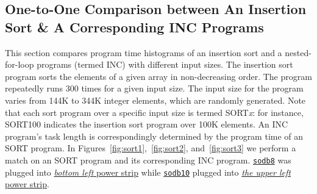 \documentclass[10pt]{article}
\begin{document}
\clearpage
\pagebreak

\subsection{One-to-One Comparison between An Insertion Sort \& A Corresponding INC Programs~\label{sec:sort}} 
This section compares program time histograms 
of an insertion sort and a nested-for-loop programs (termed INC) with different input sizes. The insertion sort program sorts the elements of a given array in non-decreasing order.  The program repeatedly runs 300 times for a given input size. The input size for the program varies from 144K to 344K integer elements, which are randomly generated. Note that each sort program over a specific input size is termed SORT{\it x}: for instance, SORT100 indicates the insertion sort program over 100K elements. An INC program's task length is correspondingly determined by the program time of an SORT program. In Figures~\ref{fig:sort1},~\ref{fig:sort2}, and~\ref{fig:sort3} 
we perform a match on an SORT program and its corresponding INC program. 
\underline{{\tt sodb8}} was plugged into \underline{{\em bottom left} power strip} 
while \underline{{\tt sodb10}} plugged into \underline{{\em the upper left} power strip}. 

%
\end{document}
